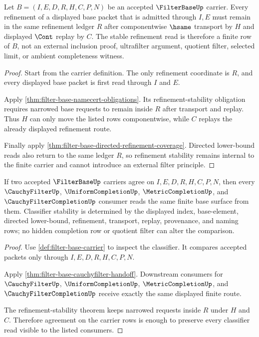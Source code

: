 \begin{theorem}
\label{thm:filter-base-refinement-stability}
Let $B=(I,E,D,R,H,C,P,N)$ be an accepted $\FilterBaseUp$ carrier. Every refinement of a displayed base packet that is admitted through $I,E$ must remain in the same refinement ledger $R$ after componentwise $\hsame$ transport by $H$ and displayed $\Cont$ replay by $C$. The stable refinement read is therefore a finite row of $B$, not an external inclusion proof, ultrafilter argument, quotient filter, selected limit, or ambient completeness witness.
\end{theorem}
\begin{proof}
Start from the carrier definition. The only refinement coordinate is $R$, and every displayed base packet is first read through $I$ and $E$.

Apply \autoref{thm:filter-base-namecert-obligations}. Its refinement-stability obligation requires narrowed base requests to remain inside $R$ after transport and replay. Thus $H$ can only move the listed rows componentwise, while $C$ replays the already displayed refinement route.

Finally apply \autoref{thm:filter-base-directed-refinement-coverage}. Directed lower-bound reads also return to the same ledger $R$, so refinement stability remains internal to the finite carrier and cannot introduce an external filter principle.
\end{proof}

\begin{theorem}
\label{thm:filter-base-classifier-stability}
If two accepted $\FilterBaseUp$ carriers agree on $I,E,D,R,H,C,P,N$, then every $\CauchyFilterUp$, $\UniformCompletionUp$, $\MetricCompletionUp$, and $\CauchyFilterCompletionUp$ consumer reads the same finite base surface from them. Classifier stability is determined by the displayed index, base-element, directed lower-bound, refinement, transport, replay, provenance, and naming rows; no hidden completion row or quotient filter can alter the comparison.
\end{theorem}
\begin{proof}
Use \autoref{def:filter-base-carrier} to inspect the classifier. It compares accepted packets only through $I,E,D,R,H,C,P,N$.

Apply \autoref{thm:filter-base-cauchyfilter-handoff}. Downstream consumers for $\CauchyFilterUp$, $\UniformCompletionUp$, $\MetricCompletionUp$, and $\CauchyFilterCompletionUp$ receive exactly the same displayed finite route.

The refinement-stability theorem keeps narrowed requests inside $R$ under $H$ and $C$. Therefore agreement on the carrier rows is enough to preserve every classifier read visible to the listed consumers.
\end{proof}


